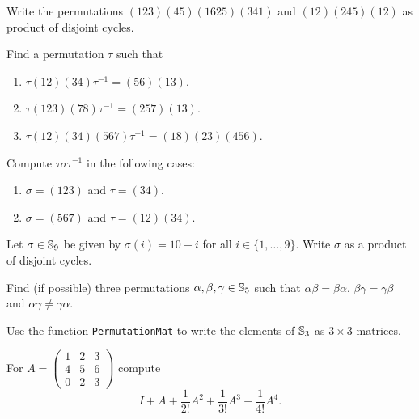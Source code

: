 \begin{prob}
    Write the permutations 
    $(123)(45)(1625)(341)$ and 
    $(12)(245)(12)$
    as product of disjoint cycles.
\end{prob}

\begin{prob}
    Find a permutation $\tau$ such that 
    \begin{enumerate}
        \item $\tau(12)(34)\tau^{-1}=(56)(13)$.
        \item $\tau(123)(78)\tau^{-1}=(257)(13)$.
        \item $\tau(12)(34)(567)\tau^{-1}=(18)(23)(456)$.
    \end{enumerate}
\end{prob}
%
%
\begin{prob}
    Compute $\tau\sigma\tau^{-1}$ in the following cases:
    \begin{enumerate}
        \item $\sigma=(123)$ and $\tau=(34)$.
        \item $\sigma=(567)$ and $\tau=(12)(34)$.
    \end{enumerate}
\end{prob}

\begin{prob}
  Let $\sigma\in\mathbb{S}_{9}$ be given by $\sigma(i)=10-i$ for all
  $i\in\{1,\dots,9\}$. Write $\sigma$ as a product of disjoint cycles.
\end{prob}

\begin{prob}
    Find (if possible) three permutations $\alpha,\beta,\gamma\in\mathbb{S}_5$
    such that $\alpha\beta=\beta\alpha$, $\beta\gamma=\gamma\beta$ and
    $\alpha\gamma\ne\gamma\alpha$.
\end{prob}

\begin{prob}
  Use the function \lstinline{PermutationMat} to write the elements of $\mathbb{S}_3$
  as $3\times 3$ matrices. 
\end{prob}

\begin{prob}
   For   
    $A=\begin{pmatrix}
        1 & 2 & 3\\
        4 & 5 & 6\\
        0 & 2 & 3
    \end{pmatrix}$ compute 
    \[
    I+A+\frac{1}{2!}A^2+\frac{1}{3!}A^3+\frac{1}{4!}A^{4}.
    \]
\end{prob}

